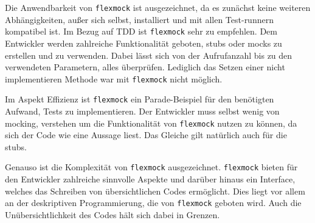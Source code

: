 Die Anwendbarkeit von \lstinline{flexmock} ist ausgezeichnet, da es zunächst
keine weiteren Abhängigkeiten, außer sich selbst, installiert und mit allen
Test-runnern kompatibel ist. Im Bezug auf TDD ist \lstinline{flexmock} sehr zu
empfehlen. Dem Entwickler werden zahlreiche Funktionalität geboten,
\Glspl{stub} oder \Glspl{mock} zu erstellen und zu verwenden. Dabei lässt sich
von der Aufrufanzahl bis zu den verwendeten Parametern, alles überprüfen.
Lediglich das Setzen einer nicht implementieren Methode war mit
\lstinline{flexmock} nicht möglich.

Im Aspekt Effizienz ist \lstinline{flexmock} ein Parade-Beispiel für den 
benötigten Aufwand, Tests zu implementieren. Der Entwickler muss selbst wenig
von \gls{mock}ing, verstehen um die Funktionalität von \lstinline{flexmock}
nutzen zu können, da sich der Code wie eine Aussage liest. Das Gleiche gilt
natürlich auch für die \Glspl{stub}.

Genauso ist die Komplexität von \lstinline{flexmock} ausgezeichnet.
\lstinline{flexmock} bieten für den Entwickler zahlreiche sinnvolle Aspekte und
darüber hinaus  ein Interface, welches das Schreiben von übersichtlichen Codes
ermöglicht. Dies liegt vor allem an der deskriptiven Programmierung, die von
\lstinline{flexmock} geboten wird. Auch die Unübersichtlichkeit des Codes hält 
sich dabei in Grenzen.